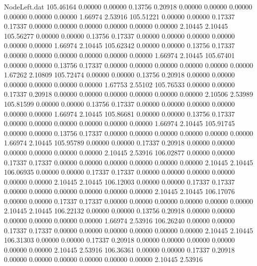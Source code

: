 \begin{filecontents}{NodeLeft.dat}
 105.46164    0.00000    0.00000     0.13756    0.20918    0.00000    0.00000    0.00000    0.00000    0.00000    0.00000    1.66974    2.53916
 105.51221    0.00000    0.00000     0.17337    0.17337    0.00000    0.00000    0.00000    0.00000    0.00000    0.00000    2.10445    2.10445
 105.56277    0.00000    0.00000     0.13756    0.17337    0.00000    0.00000    0.00000    0.00000    0.00000    0.00000    1.66974    2.10445
 105.62342    0.00000    0.00000     0.13756    0.17337    0.00000    0.00000    0.00000    0.00000    0.00000    0.00000    1.66974    2.10445
 105.67401    0.00000    0.00000     0.13756    0.17337    0.00000    0.00000    0.00000    0.00000    0.00000    0.00000    1.67262    2.10809
 105.72474    0.00000    0.00000     0.13756    0.20918    0.00000    0.00000    0.00000    0.00000    0.00000    0.00000    1.67753    2.55102
 105.76533    0.00000    0.00000     0.17337    0.20918    0.00000    0.00000    0.00000    0.00000    0.00000    0.00000    2.10506    2.53989
 105.81599    0.00000    0.00000     0.13756    0.17337    0.00000    0.00000    0.00000    0.00000    0.00000    0.00000    1.66974    2.10445
 105.86681    0.00000    0.00000     0.13756    0.17337    0.00000    0.00000    0.00000    0.00000    0.00000    0.00000    1.66974    2.10445
 105.91745    0.00000    0.00000     0.13756    0.17337    0.00000    0.00000    0.00000    0.00000    0.00000    0.00000    1.66974    2.10445
 105.95789    0.00000    0.00000     0.17337    0.20918    0.00000    0.00000    0.00000    0.00000    0.00000    0.00000    2.10445    2.53916
 106.02877    0.00000    0.00000     0.17337    0.17337    0.00000    0.00000    0.00000    0.00000    0.00000    0.00000    2.10445    2.10445
 106.06935    0.00000    0.00000     0.17337    0.17337    0.00000    0.00000    0.00000    0.00000    0.00000    0.00000    2.10445    2.10445
 106.12003    0.00000    0.00000     0.17337    0.17337    0.00000    0.00000    0.00000    0.00000    0.00000    0.00000    2.10445    2.10445
 106.17076    0.00000    0.00000     0.17337    0.17337    0.00000    0.00000    0.00000    0.00000    0.00000    0.00000    2.10445    2.10445
 106.22132    0.00000    0.00000     0.13756    0.20918    0.00000    0.00000    0.00000    0.00000    0.00000    0.00000    1.66974    2.53916
 106.26240    0.00000    0.00000     0.17337    0.17337    0.00000    0.00000    0.00000    0.00000    0.00000    0.00000    2.10445    2.10445
 106.31303    0.00000    0.00000     0.17337    0.20918    0.00000    0.00000    0.00000    0.00000    0.00000    0.00000    2.10445    2.53916
 106.36361    0.00000    0.00000     0.17337    0.20918    0.00000    0.00000    0.00000    0.00000    0.00000    0.00000    2.10445    2.53916

\end{filecontents}
